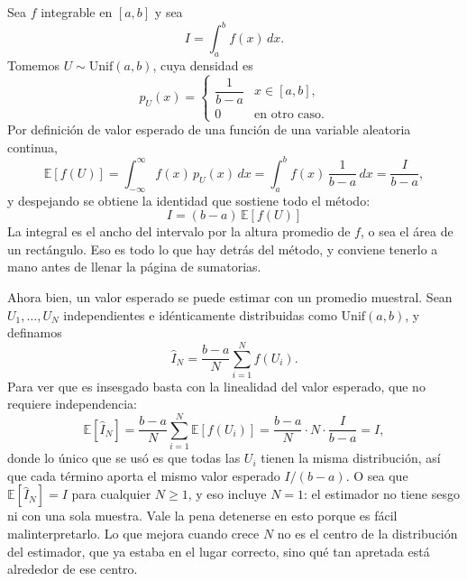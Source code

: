 \documentclass[11pt,letterpaper]{article}
\begin{document}
Sea $f$ integrable en $[a,b]$ y sea
\begin{equation}
I = \int_a^b f(x)\,dx.
\end{equation}
Tomemos $U \sim \mathrm{Unif}(a,b)$, cuya densidad es
\begin{equation}
p_U(x) = \begin{cases} \dfrac{1}{b-a} & x \in [a,b],\\[6pt] 0 &
\text{en otro caso.}\end{cases}
\end{equation}
Por definición de valor esperado de una función de una variable aleatoria
continua,
\begin{equation}
\mathbb{E}[f(U)] = \int_{-\infty}^{\infty} f(x)\,p_U(x)\,dx
= \int_a^b f(x)\,\frac{1}{b-a}\,dx = \frac{I}{b-a},
\end{equation}
y despejando se obtiene la identidad que sostiene todo el método:
\begin{equation}
\boxed{\,I = (b-a)\,\mathbb{E}[f(U)]\,}
\label{eq:mcidentidad}
\end{equation}
La integral es el ancho del intervalo por la altura promedio de $f$, o sea el
área de un rectángulo. Eso es todo lo que hay detrás del método, y conviene
tenerlo a mano antes de llenar la página de sumatorias.

Ahora bien, un valor esperado se puede estimar con un promedio muestral. Sean
$U_1,\dots,U_N$ independientes e idénticamente distribuidas como
$\mathrm{Unif}(a,b)$, y definamos
\begin{equation}
\hat{I}_N = \frac{b-a}{N}\sum_{i=1}^{N} f(U_i).
\label{eq:estimador}
\end{equation}
Para ver que es insesgado basta con la linealidad del valor esperado, que no
requiere independencia:
\begin{equation}
\mathbb{E}[\hat{I}_N]
= \frac{b-a}{N}\sum_{i=1}^{N} \mathbb{E}[f(U_i)]
= \frac{b-a}{N}\cdot N \cdot \frac{I}{b-a}
= I,
\end{equation}
donde lo único que se usó es que todas las $U_i$ tienen la misma
distribución, así que cada término aporta el mismo valor esperado
$I/(b-a)$. O sea que $\mathbb{E}[\hat{I}_N] = I$ para cualquier $N \ge 1$, y
eso incluye $N = 1$: el estimador no tiene sesgo ni con una sola muestra.
Vale la pena detenerse en esto porque es fácil malinterpretarlo. Lo que
mejora cuando crece $N$ no es el centro de la distribución del estimador,
que ya estaba en el lugar correcto, sino qué tan apretada está alrededor de
ese centro.
\end{document}
